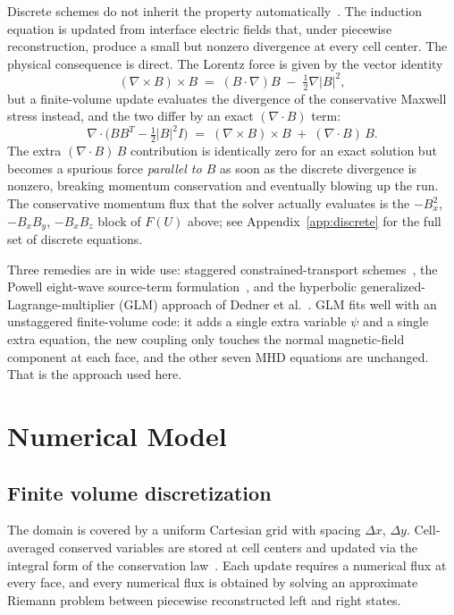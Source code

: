 \documentclass[11pt]{article}
\begin{document}
Discrete schemes do not inherit the property automatically~\cite{balsara1999,powell1999}.  The induction equation is updated from interface electric fields that, under piecewise reconstruction, produce a small but nonzero divergence at every cell center.  The physical consequence is direct.  The Lorentz force is given by the vector identity
\[
(\nabla\times B)\times B \;=\; (B\cdot\nabla)B \;-\; \tfrac{1}{2}\nabla|B|^{2},
\]
but a finite-volume update evaluates the divergence of the conservative Maxwell stress instead, and the two differ by an exact $(\nabla\cdot B)$ term:
\[
\nabla\cdot\!\bigl(BB^{T} - \tfrac{1}{2}|B|^{2}I\bigr)
  \;=\; (\nabla\times B)\times B \;+\; (\nabla\cdot B)\,B.
\]
The extra $(\nabla\cdot B)\,B$ contribution is identically zero for an exact solution but becomes a spurious force \emph{parallel to $B$} as soon as the discrete divergence is nonzero, breaking momentum conservation and eventually blowing up the run.  The conservative momentum flux that the solver actually evaluates is the $-B_x^{2}$, $-B_xB_y$, $-B_xB_z$ block of $F(U)$ above; see Appendix~\ref{app:discrete} for the full set of discrete equations.

Three remedies are in wide use: staggered constrained-transport schemes~\cite{balsara1999,londrillo2000}, the Powell eight-wave source-term formulation~\cite{powell1999}, and the hyperbolic generalized-Lagrange-multiplier (GLM) approach of Dedner et al.~\cite{dedner2002}.  GLM fits well with an unstaggered finite-volume code: it adds a single extra variable $\psi$ and a single extra equation, the new coupling only touches the normal magnetic-field component at each face, and the other seven MHD equations are unchanged.  That is the approach used here.

\section{Numerical Model}

\subsection{Finite volume discretization}

The domain is covered by a uniform Cartesian grid with spacing $\Delta x$, $\Delta y$.  Cell-averaged conserved variables are stored at cell centers and updated via the integral form of the conservation law~\cite{versteeg2007,moukalled2016,toro2009}.  Each update requires a numerical flux at every face, and every numerical flux is obtained by solving an approximate Riemann problem between piecewise reconstructed left and right states.
\end{document}
